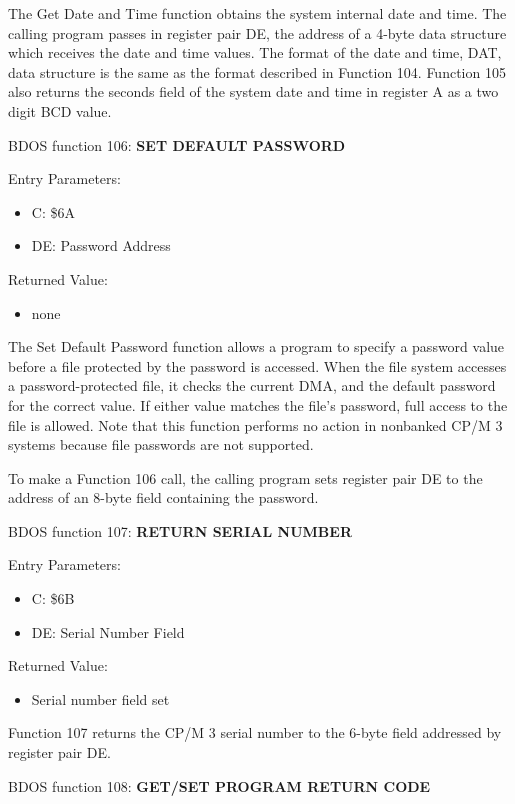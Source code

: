 The Get Date and Time function obtains the system internal date and
time. The calling program passes in register pair DE, the address of a
4-byte data structure which receives the date and time values. The
format of the date and time, DAT, data structure is the same as the
format described in Function 104. Function 105 also returns the
seconds field of the system date and time in register A as a two digit
BCD value.

BDOS function 106: \textbf{SET DEFAULT PASSWORD}

Entry Parameters:
\begin{itemize}
\item[] C: \$6A
\item[] DE: Password Address
\end{itemize}

Returned Value:
\begin{itemize}
\item[] none
\end{itemize}

The Set Default Password function allows a program to specify a
password value before a file protected by the password is
accessed. When the file system accesses a password-protected file, it
checks the current DMA, and the default password for the correct
value. If either value matches the file's password, full access to the
file is allowed. Note that this function performs no action in
nonbanked CP/M 3 systems because file passwords are not supported.

To make a Function 106 call, the calling program sets register pair DE
to the address of an 8-byte field containing the password.

BDOS function 107: \textbf{RETURN SERIAL NUMBER}

Entry Parameters:
\begin{itemize}
\item[] C: \$6B
\item[] DE: Serial Number Field
\end{itemize}

Returned Value:
\begin{itemize}
\item[] Serial number field set
\end{itemize}

Function 107 returns the CP/M 3 serial number to the 6-byte field
addressed by register pair DE.

BDOS function 108: \textbf{GET/SET PROGRAM RETURN CODE}

